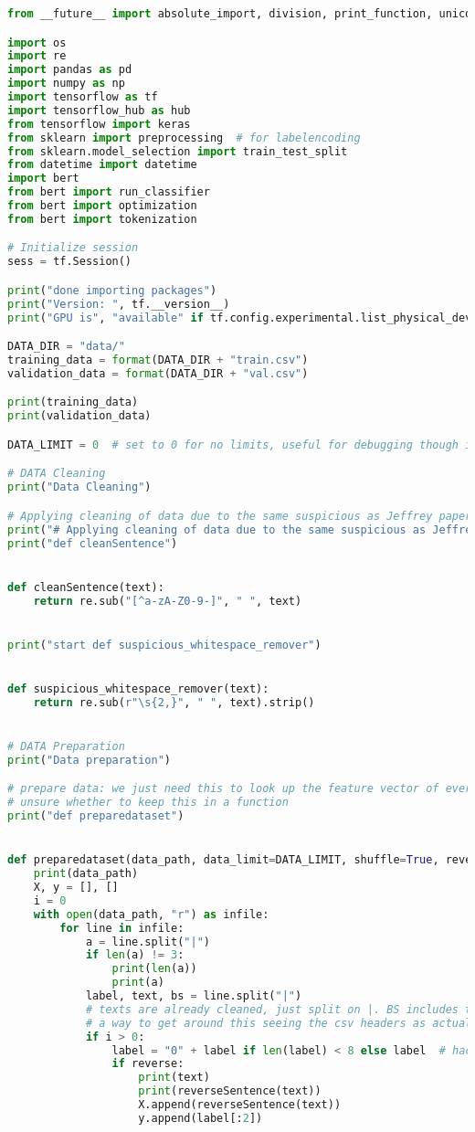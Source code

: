 \begin{lstlisting}[language=Python, caption=My attempt to adapt BERT to short text classification]
from __future__ import absolute_import, division, print_function, unicode_literals

import os
import re
import pandas as pd
import numpy as np
import tensorflow as tf
import tensorflow_hub as hub
from tensorflow import keras
from sklearn import preprocessing  # for labelencoding
from sklearn.model_selection import train_test_split
from datetime import datetime
import bert
from bert import run_classifier
from bert import optimization
from bert import tokenization

# Initialize session
sess = tf.Session()

print("done importing packages")
print("Version: ", tf.__version__)
print("GPU is", "available" if tf.config.experimental.list_physical_devices("GPU") else "NOT AVAILABLE")

DATA_DIR = "data/"
training_data = format(DATA_DIR + "train.csv")
validation_data = format(DATA_DIR + "val.csv")

print(training_data)
print(validation_data)

DATA_LIMIT = 0  # set to 0 for no limits, useful for debugging though it is not representative of actual performance

# DATA Cleaning
print("Data Cleaning")

# Applying cleaning of data due to the same suspicious as Jeffrey paper suggest
print("# Applying cleaning of data due to the same suspicious as Jeffrey paper suggest")
print("def cleanSentence")


def cleanSentence(text):
    return re.sub("[^a-zA-Z0-9-]", " ", text)


print("start def suspicious_whitespace_remover")


def suspicious_whitespace_remover(text):
    return re.sub(r"\s{2,}", " ", text).strip()


# DATA Preparation
print("Data preparation")

# prepare data: we just need this to look up the feature vector of every word we can encounter.
# unsure whether to keep this in a function
print("def preparedataset")


def preparedataset(data_path, data_limit=DATA_LIMIT, shuffle=True, reverse=False):
    print(data_path)
    X, y = [], []
    i = 0
    with open(data_path, "r") as infile:
        for line in infile:
            a = line.split("|")
            if len(a) != 3:
                print(len(a))
                print(a)
            label, text, bs = line.split("|")
            # texts are already cleaned, just split on |. BS includes the time stamp (not used at this time)
            # a way to get around this seeing the csv headers as actual data entries. We don't want any of that
            if i > 0:
                label = "0" + label if len(label) < 8 else label  # hacky way to solve yet another string to int issue
                if reverse:
                    print(text)
                    print(reverseSentence(text))
                    X.append(reverseSentence(text))
                    y.append(label[:2])


\end{lstlisting}
